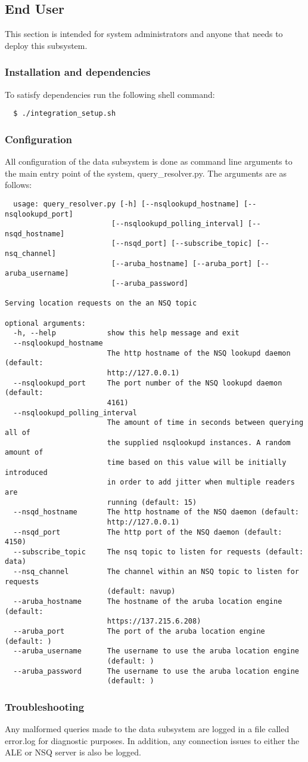 \subsection{End User}
This section is intended for system administrators and anyone that needs to deploy this subsystem.
\subsubsection{Installation and dependencies}
To satisfy dependencies run the following shell command:
\begin{verbatim}
  $ ./integration_setup.sh
\end{verbatim}
\subsubsection{Configuration}
All configuration of the data subsystem is done as command line arguments to the main entry point of the system, query\_resolver.py. The arguments are as follows:
\begin{verbatim}
  usage: query_resolver.py [-h] [--nsqlookupd_hostname] [--nsqlookupd_port]
                         [--nsqlookupd_polling_interval] [--nsqd_hostname]
                         [--nsqd_port] [--subscribe_topic] [--nsq_channel]
                         [--aruba_hostname] [--aruba_port] [--aruba_username]
                         [--aruba_password]

Serving location requests on the an NSQ topic

optional arguments:
  -h, --help            show this help message and exit
  --nsqlookupd_hostname
                        The http hostname of the NSQ lookupd daemon (default:
                        http://127.0.0.1)
  --nsqlookupd_port     The port number of the NSQ lookupd daemon (default:
                        4161)
  --nsqlookupd_polling_interval
                        The amount of time in seconds between querying all of
                        the supplied nsqlookupd instances. A random amount of
                        time based on this value will be initially introduced
                        in order to add jitter when multiple readers are
                        running (default: 15)
  --nsqd_hostname       The http hostname of the NSQ daemon (default:
                        http://127.0.0.1)
  --nsqd_port           The http port of the NSQ daemon (default: 4150)
  --subscribe_topic     The nsq topic to listen for requests (default: data)
  --nsq_channel         The channel within an NSQ topic to listen for requests
                        (default: navup)
  --aruba_hostname      The hostname of the aruba location engine (default:
                        https://137.215.6.208)
  --aruba_port          The port of the aruba location engine (default: )
  --aruba_username      The username to use the aruba location engine
                        (default: )
  --aruba_password      The username to use the aruba location engine
                        (default: )
\end{verbatim}
\subsubsection{Troubleshooting}
Any malformed queries made to the data subsystem are logged in a file called error.log for diagnostic purposes. In addition, any connection issues to either the ALE or NSQ server is also be logged.
